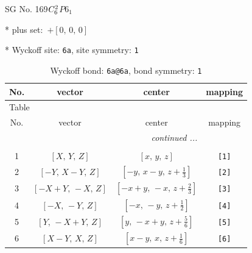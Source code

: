 \documentclass[fleqn,8pt]{jsarticle}
\begin{document}
\setcounter{MaxMatrixCols}{32}

\renewcommand{\tablename}{Table~}
\renewcommand{\figurename}{Figure~}
\begin{center}
\LARGE
SG No. 169\quad$C_{\rm 6}^{2}$\quad$P6_1$\quad[ hexagonal ]
\end{center}

* plus set:\,\,\,$+\left[ 0,\, 0,\, 0 \right]$


* Wyckoff site: {\tt 6a}, site symmetry: {\tt 1}
\renewcommand{\arraystretch}{1.2}
\begin{longtable}{cccc}
\caption{Wyckoff bond: {\tt 6a@6a}, bond symmetry: {\tt 1}}
 \\
 \hline \hline
No. & vector & center & mapping \\ \hline \endfirsthead

\multicolumn{3}{l}{\tablename\ \thetable{}} \\
 \hline \hline
No. & vector & center & mapping \\ \hline \endhead

 \hline \hline
\multicolumn{3}{r}{\footnotesize\it continued ...} \\ \endfoot

 \hline \hline
\multicolumn{3}{r}{} \\ \endlastfoot

1 & $\left[ X,\, Y,\, Z \right]$ & $\left[ x,\, y,\, z \right]$ & {\tt [1]} \\ \hline
2 & $\left[ - Y,\, X - Y,\, Z \right]$ & $\left[ - y,\, x - y,\, z + \frac{1}{3} \right]$ & {\tt [2]} \\ \hline
3 & $\left[ - X + Y,\, - X,\, Z \right]$ & $\left[ - x + y,\, - x,\, z + \frac{2}{3} \right]$ & {\tt [3]} \\ \hline
4 & $\left[ - X,\, - Y,\, Z \right]$ & $\left[ - x,\, - y,\, z + \frac{1}{2} \right]$ & {\tt [4]} \\ \hline
5 & $\left[ Y,\, - X + Y,\, Z \right]$ & $\left[ y,\, - x + y,\, z + \frac{5}{6} \right]$ & {\tt [5]} \\ \hline
6 & $\left[ X - Y,\, X,\, Z \right]$ & $\left[ x - y,\, x,\, z + \frac{1}{6} \right]$ & {\tt [6]} \\
\end{longtable}
\end{document}
